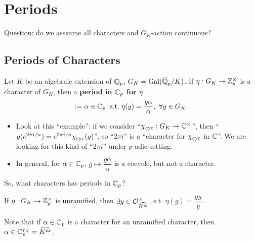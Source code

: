 \section{Periods}
{\color{red}Question: do we asssume all characters and $G_K$-action continuous?
}
\subsection{Periods of Characters}

Let $K$ be an algebraic extension of $\mathbb{Q}_p$,
$G_K = \operatorname{Gal}(\overline{\mathbb{Q}}_p/K)$.
If $\eta : G_K\to\mathbb{Z}_p^\times$ is a character of $G_K$,
then a \textbf{period in $\mathbb{C}_p$ for $\eta$} \[:= \alpha\in\mathbb{C}_p\ \;\mathrm{s.t.}\; \eta(g) = \frac{g\alpha}{\alpha},\ \forall g\in G_K.\]
\begin{remark}
    \begin{itemize}
        \item Look at this ``example'': if we consider ``$\chi_{\mathrm{cyc}} : G_K\to\mathbb{C}^\times$'',
        then ``$g(e^{2\pi i/n}) = e^{2\pi i/n}\chi_{\mathrm{cyc}}(g)$'',
        so ``$2\pi i$'' is a ``character for $\chi_{\mathrm{cyc}}$ in $\mathbb{C}$''.
        We are looking for this kind of ``$2\pi i$'' under $p$-adic setting.
        \item In general, for $\alpha\in\mathbb{C}_p$, $g\mapsto \dfrac{g\alpha}{\alpha}$ is a cocycle, but not a character.
    \end{itemize}
\end{remark}
So, what characters has periods in $\mathbb{C}_p$? 
\begin{theorem}\label{unramified character is Cp-admissible}
    If $\eta : G_K\to\mathbb{Z}_p^\times$ is unramified,
    then $\exists y\in\mathcal{O}_{\widehat{K^{\mathrm{nr}}}}^\times$, s.t. $\eta(g) = \dfrac{gy }{y}$. 
\end{theorem}
Note that if $\alpha\in\mathbb{C}_p$ is a character for an
unramified character, then
$\alpha\in \mathbb{C}_p^{I_K} = \widehat{K^{\mathrm{nr}}}$. 
